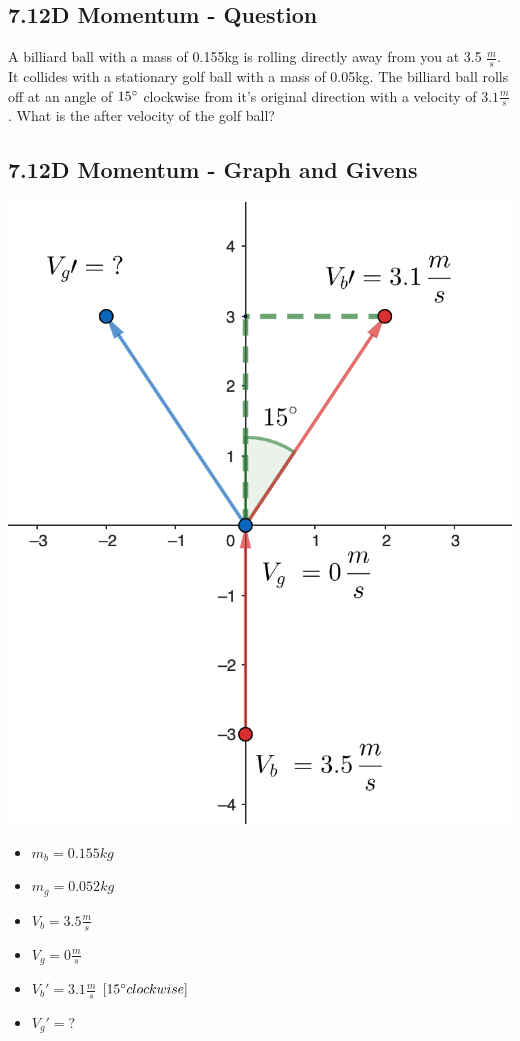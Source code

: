\subsection*{7.1\hspace*{0.5cm}2D Momentum - Question}
\begin{flushleft}
    A billiard ball with a mass of 0.155kg is rolling directly
    away from you at 3.5 $\frac{m}{s}$. It collides with a stationary golf ball with
    a mass of 0.05kg. The billiard ball rolls off at an angle of $15\degree$ clockwise
    from it's original direction with a velocity of $3.1\frac{m}{s}$. What is the after
    velocity of the golf ball?
\end{flushleft}
\subsection*{7.1\hspace*{0.5cm}2D Momentum - Graph and Givens}
\begin{minipage}{0.5\textwidth}
    \includegraphics[scale=0.33]{./images/2d_momentum_graph}
\end{minipage}
\begin{minipage}{0.5\textwidth}
    \begin{itemize}
        \item $m_{b} = 0.155kg$
        \item $m_{g} = 0.052kg$
        \item $V_{b} = 3.5\frac{m}{s}$
        \item $V_{g} = 0\frac{m}{s}$
        \item $V_{b}\prime = 3.1\frac{m}{s}$ $[15\degree clockwise]$
        \item $V_{g}\prime = ?$
    \end{itemize}
\end{minipage}
